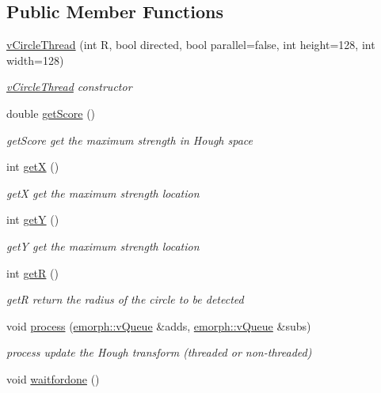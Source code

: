 \subsection*{Public Member Functions}
\begin{DoxyCompactItemize}
\item 
\hyperlink{classvCircleThread_ab1202e2b0cebcad0ddbe6033e3742d4e}{v\-Circle\-Thread} (int R, bool directed, bool parallel=false, int height=128, int width=128)
\begin{DoxyCompactList}\small\item\em \hyperlink{classvCircleThread}{v\-Circle\-Thread} constructor \end{DoxyCompactList}\item 
double \hyperlink{classvCircleThread_a692a1066ee63c2716998fcb3a7aa513d}{get\-Score} ()
\begin{DoxyCompactList}\small\item\em get\-Score get the maximum strength in Hough space \end{DoxyCompactList}\item 
int \hyperlink{classvCircleThread_a0feac9f937bfeecc2dc0b015f9e8161c}{get\-X} ()
\begin{DoxyCompactList}\small\item\em get\-X get the maximum strength location \end{DoxyCompactList}\item 
int \hyperlink{classvCircleThread_a4f39898c53c3178b84b28c8cc33ec352}{get\-Y} ()
\begin{DoxyCompactList}\small\item\em get\-Y get the maximum strength location \end{DoxyCompactList}\item 
int \hyperlink{classvCircleThread_a024aa1ad0a7855fad146425c80feadb0}{get\-R} ()
\begin{DoxyCompactList}\small\item\em get\-R return the radius of the circle to be detected \end{DoxyCompactList}\item 
void \hyperlink{classvCircleThread_a97d976b1db541ddaf19f4688212cb05b}{process} (\hyperlink{classemorph_1_1vQueue}{emorph\-::v\-Queue} \&adds, \hyperlink{classemorph_1_1vQueue}{emorph\-::v\-Queue} \&subs)
\begin{DoxyCompactList}\small\item\em process update the Hough transform (threaded or non-\/threaded) \end{DoxyCompactList}\item 
\hypertarget{classvCircleThread_a0d32749f12d2d93ff0d9ccdf37422ccf}{void \hyperlink{classvCircleThread_a0d32749f12d2d93ff0d9ccdf37422ccf}{waitfordone} ()}\label{classvCircleThread_a0d32749f12d2d93ff0d9ccdf37422ccf}


\end{DoxyCompactItemize}
